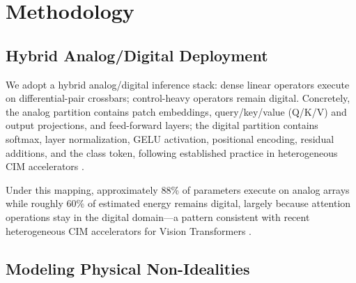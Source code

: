 \section{Methodology}
\label{sec:methodology}

\subsection{Hybrid Analog/Digital Deployment}
\label{subsec:hybrid-deployment}

We adopt a hybrid analog/digital inference stack: dense linear operators execute on differential-pair crossbars; control-heavy operators remain digital. Concretely, the analog partition contains patch embeddings, query/key/value (Q/K/V) and output projections, and feed-forward layers; the digital partition contains softmax, layer normalization, GELU activation, positional encoding, residual additions, and the class token, following established practice in heterogeneous CIM accelerators \citep{wu2023bwq,wang2024epim,ge2024allspark,wang2025hemlet,liu2024hardsea}.

Under this mapping, approximately 88\% of parameters execute on analog arrays while roughly 60\% of estimated energy remains digital, largely because attention operations stay in the digital domain---a pattern consistent with recent heterogeneous CIM accelerators for Vision Transformers \citep{liu2024hardsea,wang2024epim,ge2024allspark,wang2025hemlet}.

\subsection{Modeling Physical Non-Idealities}
\label{subsec:modeling-nonidealities}

